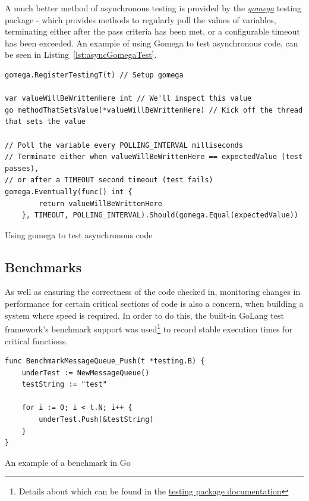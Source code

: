 A much better method of asynchronous testing is provided by the
\href{https://github.com/onsi/gomega}{\emph{gomega}} testing package - which
provides methods to regularly poll the values of variables, terminating either
after the pass criteria has been met, or a configurable timeout has been
exceeded. An example of using Gomega to test asynchronous code, can be seen in
Listing~\ref{lst:asyncGomegaTest}.

\begin{listing}[H]
  \centering
  \begin{verbatim}
gomega.RegisterTestingT(t) // Setup gomega

var valueWillBeWrittenHere int // We'll inspect this value
go methodThatSetsValue(*valueWillBeWrittenHere) // Kick off the thread that sets the value

// Poll the variable every POLLING_INTERVAL milliseconds
// Terminate either when valueWillBeWrittenHere == expectedValue (test passes),
// or after a TIMEOUT second timeout (test fails)
gomega.Eventually(func() int {
		return valueWillBeWrittenHere
	}, TIMEOUT, POLLING_INTERVAL).Should(gomega.Equal(expectedValue))
  \end{verbatim}
  \caption{Using gomega to test asynchronous code}
  \label{lst:asyncGomegaTest}
\end{listing}

\subsection{Benchmarks}
\label{sub:benchmarks}

As well as ensuring the correctness of the code checked in, monitoring changes
in performance for certain critical sections of code is also a concern, when
building a system where speed is required. In order to do this, the built-in
GoLang test framework's benchmark support was used\footnote{Details about which
can be found in the \href{https://golang.org/pkg/testing/}{testing package
documentation}} to record stable execution times for critical functions.

\begin{listing}
  \centering
  \begin{verbatim}
func BenchmarkMessageQueue_Push(t *testing.B) {
	underTest := NewMessageQueue()
	testString := "test"

	for i := 0; i < t.N; i++ {
		underTest.Push(&testString)
	}
}
  \end{verbatim}
  \caption{An example of a benchmark in Go}
  \label{lst:goBenchmark}
\end{listing}


